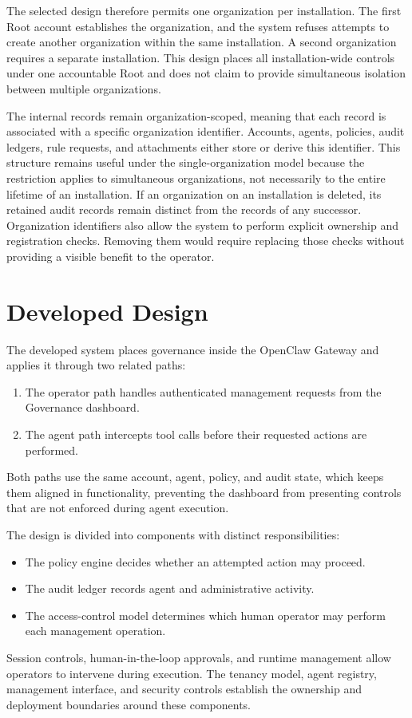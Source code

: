 The selected design therefore permits one organization per installation. The
first Root account establishes the organization, and the system refuses attempts
to create another organization within the same installation. A second
organization requires a separate installation. This design places all
installation-wide controls under one accountable Root and does not claim to
provide simultaneous isolation between multiple organizations.

The internal records remain organization-scoped, meaning that each record is
associated with a specific organization identifier. Accounts, agents, policies,
audit ledgers, rule requests, and attachments either store or derive this
identifier. This structure remains useful under the single-organization model
because the restriction applies to simultaneous organizations, not necessarily
to the entire lifetime of an installation. If an organization on an installation is deleted, its
retained audit records remain distinct from the records of any successor.
Organization identifiers also allow the system to perform explicit ownership
and registration checks. Removing them would require replacing those checks
without providing a visible benefit to the operator.

\section{Developed Design}
\label{sec:gov-developed}

The developed system places governance inside the OpenClaw Gateway and applies
it through two related paths:
\begin{enumerate}
\item The operator path handles authenticated management requests from the Governance dashboard. 
\item The agent path intercepts tool calls
before their requested actions are performed. 
\end{enumerate}
Both paths use the same account,
agent, policy, and audit state, which keeps them aligned in functionality, preventing the dashboard from
presenting controls that are not enforced during agent execution.

The design is divided into components with distinct responsibilities:
\begin{itemize}
    \item The policy engine decides whether an attempted action may proceed.
    \item The audit ledger records agent and administrative activity.
    \item The access-control model determines which human operator may perform each management operation.
\end{itemize}
Session controls,
human-in-the-loop approvals, and runtime management allow operators to intervene
during execution. The tenancy model, agent registry, management interface, and
security controls establish the ownership and deployment boundaries around
these components. 

